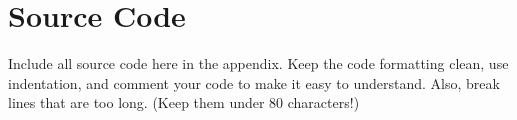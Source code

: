 \newpage

\appendix

\section{Source Code}

Include all source code here in the appendix. Keep the code formatting clean,
use indentation, and comment your code to make it easy to understand. Also,
break lines that are too long. (Keep them under 80 characters!)

%

%


% 

% 

% 

% 

% 


